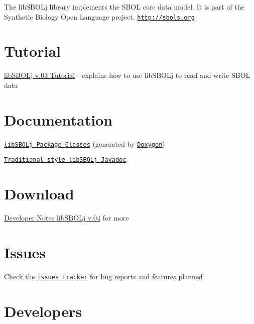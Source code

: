 The libSBOLj library implements the SBOL core data model. It is part of the Synthetic Biology Open Language project. \href{http://sbols.org}{\tt http://sbols.org} \hypertarget{index_tutorial_sec}{}\section{Tutorial}\label{index_tutorial_sec}

\begin{DoxyItemize}
\item \hyperlink{tutorial}{libSBOLj v.03 Tutorial} -\/ explains how to use libSBOLj to read and write SBOL data
\end{DoxyItemize}\hypertarget{index_doc_sec}{}\section{Documentation}\label{index_doc_sec}

\begin{DoxyItemize}
\item \href{annotated.html}{\tt libSBOLj Package Classes} (generated by \href{http://www.stack.nl/~dimitri/doxygen/}{\tt Doxygen})
\item \href{../../../documentation/classic_javadoc/index.html}{\tt Traditional style libSBOLj Javadoc}
\end{DoxyItemize}\hypertarget{index_download_sec}{}\section{Download}\label{index_download_sec}

\begin{DoxyItemize}
\item \hyperlink{devnotes}{Developer Notes libSBOLj v.04} for more
\end{DoxyItemize}\hypertarget{index_issues_sec}{}\section{Issues}\label{index_issues_sec}

\begin{DoxyItemize}
\item Check the \href{https://github.com/mgaldzic/libSBOLj/issues}{\tt issues tracker} for bug reports and features planned
\end{DoxyItemize}\hypertarget{index_author_sec}{}\section{Developers}\label{index_author_sec}

